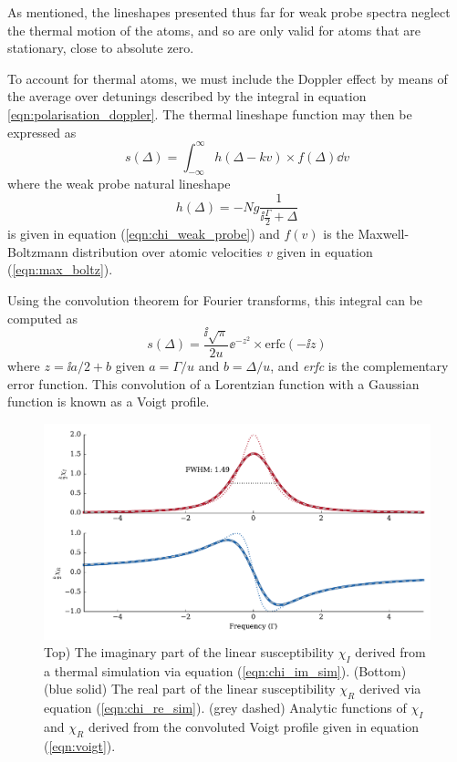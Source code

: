     As mentioned, the lineshapes presented thus far for weak probe spectra
    neglect the thermal motion of the atoms, and so are only valid for atoms
    that are stationary, \ie close to absolute zero. 

    To account for thermal atoms, we must include the Doppler effect by means of
    the average over detunings described by the integral in equation
    \ref{eqn:polarisation_doppler}. The thermal lineshape function may then be expressed as
    \begin{equation}
      s(\Delta) = \int_{-\infty}^\infty h(\Delta - k v) \times f(\Delta) \dd v
    \end{equation}
    where the weak probe natural lineshape
    \begin{equation}
      h(\Delta) = -Ng \frac{1}{\ii \frac{\Gamma}{2} + \Delta}
    \end{equation}
    is given in equation (\ref{eqn:chi_weak_probe}) and $f(v)$ is the Maxwell-
    Boltzmann distribution over atomic velocities $v$ given in equation
    (\ref{eqn:max_boltz}).

    Using the convolution theorem for Fourier transforms, this integral can be computed as
    \begin{equation}
      s(\Delta) = \frac{\ii\sqrt{\pi}}{2u} \ee^{-z^2} \times \mathrm{erfc}(-\ii z)
      \label{eqn:voigt}
    \end{equation}
    where $z = \ii a/2  + b$ given $a = \Gamma/u$ and $b = \Delta/u$, and
    \textit{erfc} is the complementary error function.\cite{Siddons2008} This
    convolution of a Lorentzian function with a Gaussian function is known as a
    Voigt profile.

    \begin{figure}[]
      \includegraphics[width=\linewidth]{figs/02_propagation/mb_two_solve_wpdopp_t01_Ng0010_vel05_D10_2_fig3.pdf}
      \caption{
      Top) The imaginary part of the linear susceptibility $\chi_I$ derived from
      a thermal simulation via equation (\ref{eqn:chi_im_sim}). (Bottom) (blue
      solid) The real part of the linear susceptibility $\chi_R$ derived via
      equation (\ref{eqn:chi_re_sim}). (grey dashed) Analytic functions of
      $\chi_I$ and $\chi_R$ derived from the convoluted Voigt profile given in
      equation (\ref{eqn:voigt}).
      } 
      \label{fig:linear_scan_dopp}
    \end{figure}

